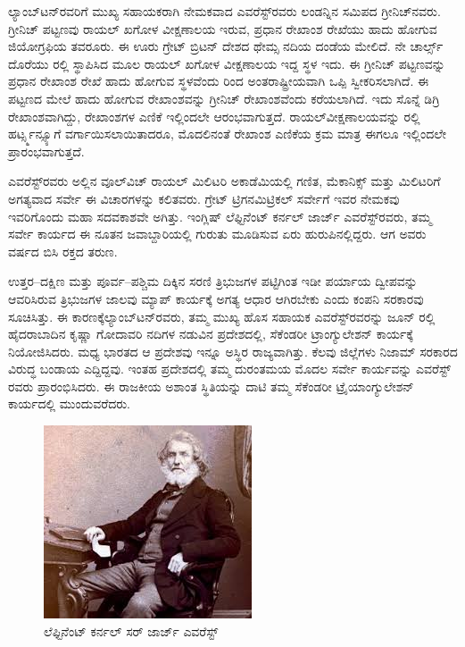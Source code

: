 ಲ್ಯಾಂಬ್​ಟನ್​ರವರಿಗೆ ಮುಖ್ಯ ಸಹಾಯಕರಾಗಿ ನೇಮಕವಾದ ಎವರೆಸ್ಟ್​ರವರು ಲಂಡನ್ನಿನ ಸಮಿಪದ ಗ್ರೀನಿಚ್​ನವರು. ಗ್ರೀನಿಚ್​ ಪಟ್ಟಣವು ರಾಯಲ್​ ಖಗೋಳ ವೀಕ್ಷಣಾಲಯ ಇರುವ, ಪ್ರಧಾನ ರೇಖಾಂಶ ರೇಖೆಯು ಹಾದು ಹೋಗುವ ಜಿಯೋಗ್ರಫಿಯ ತವರೂರು. ಈ ಊರು ಗ್ರೇಟ್​ ಬ್ರಿಟನ್​ ದೇಶದ ಥೇಮ್ಸ ನದಿಯ ದಂಡೆಯ ಮೇಲಿದೆ. ನೇ ಚಾರ್ಲ್ಸ್ ದೊರೆಯು ರಲ್ಲಿ ಸ್ಥಾಪಿಸಿದ ಮೂಲ ರಾಯಲ್​ ಖಗೋಳ ವೀಕ್ಷಣಾಲಯ ಇದ್ದ ಸ್ಥಳ ಇದು. ಈ ಗ್ರೀನಿಚ್​ ಪಟ್ಟಣವನ್ನು ಪ್ರಧಾನ ರೇಖಾಂಶ ರೇಖೆ ಹಾದು ಹೋಗುವ ಸ್ಥಳವೆಂದು  ರಿಂದ ಅಂತರಾಷ್ಟ್ರೀಯವಾಗಿ ಒಪ್ಪಿ ಸ್ವೀಕರಿಸಲಾಗಿದೆ. ಈ ಪಟ್ಟಣದ ಮೇಲೆ ಹಾದು ಹೋಗುವ ರೇಖಾಂಶವನ್ನು ಗ್ರೀನಿಚ್​ ರೇಖಾಂಶವೆಂದು ಕರೆಯಲಾಗಿದೆ. ಇದು ಸೊನ್ನೆ ಡಿಗ್ರಿ ರೇಖಾಂಶವಾಗಿದ್ದು, ರೇಖಾಂಶಗಳ ಎಣಿಕೆ ಇಲ್ಲಿಂದಲೇ ಆರಂಭವಾಗುತ್ತದೆ. ರಾಯಲ್​\break ವೀಕ್ಷಣಾಲಯವನ್ನು ರಲ್ಲಿ ಹರ್ಟ್ಸ್ಮನ್ಸ್ಯೂಗೆ ವರ್ಗಾಯಿಸಲಾಯಿತಾದರೂ, ಮೊದಲಿನಂತೆ ರೇಖಾಂಶ ಎಣಿಕೆಯ ಕ್ರಮ ಮಾತ್ರ ಈಗಲೂ ಇಲ್ಲಿಂದಲೇ ಪ್ರಾರಂಭವಾಗುತ್ತದೆ.

ಎವರೆಸ್ಟ್​ರವರು ಅಲ್ಲಿನ ವೂಲ್​ವಿಚ್​ ರಾಯಲ್​ ಮಿಲಿಟರಿ ಅಕಾಡೆಮಿಯಲ್ಲಿ ಗಣಿತ, ಮೆಕಾನಿಕ್ಸ್​ ಮತ್ತು ಮಿಲಿಟರಿಗೆ ಅಗತ್ಯವಾದ ಸರ್ವೇ ಈ ವಿಚಾರಗಳನ್ನು ಕಲಿತವರು. ಗ್ರೇಟ್​ ಟ್ರಿಗನಮಿಟ್ರಿಕಲ್​ ಸರ್ವೇಗೆ ಇವರ ನೇಮಕವು ಇವರಿಗೊಂದು ಮಹಾ ಸದವಕಾಶವೇ ಅಗಿತ್ತು. ಇಂಗ್ಲಿಷ್​ ಲೆಫ್ಟಿನೆಂಟ್​ ಕರ್ನಲ್​ ಜಾರ್ಜ್ ಎವರೆಸ್ಟ್​ರವರು, ತಮ್ಮ ಸರ್ವೇ ಕಾರ್ಯದ ಈ ನೂತನ ಜವಾಬ್ದಾರಿಯಲ್ಲಿ ಗುರುತು ಮೂಡಿಸುವ ಏರು ಹುರುಪಿನಲ್ಲಿದ್ದರು. ಆಗ ಅವರು  ವರ್ಷದ ಬಿಸಿ ರಕ್ತದ ತರುಣ.

ಉತ್ತರ–ದಕ್ಷಿಣ ಮತ್ತು ಪೂರ್ವ–ಪಶ್ಚಿಮ ದಿಕ್ಕಿನ ಸರಣಿ ತ್ರಿಭುಜಗಳ ಪಟ್ಟಿಗಿಂತ ಇಡೀ ಪರ್ಯಾಯ ದ್ವೀಪವನ್ನು ಆವರಿಸಿರುವ ತ್ರಿಭುಜಗಳ ಜಾಲವು ಮ್ಯಾಪ್​ ಕಾರ್ಯಕ್ಕೆ ಅಗತ್ಯ ಆಧಾರ ಆಗಿರಬೇಕು ಎಂದು ಕಂಪನಿ ಸರಕಾರವು ಸೂಚಿಸಿತ್ತು. ಈ ಕಾರಣಕ್ಕೆ\break ಲ್ಯಾಂಬ್​ಟನ್​ರವರು, ತಮ್ಮ ಮುಖ್ಯ ಹೊಸ ಸಹಾಯಕ ಎವರೆಸ್ಟ್​ರವರನ್ನು ಜೂನ್​  ರಲ್ಲಿ ಹೈದರಾಬಾದಿನ ಕೃಷ್ಣಾ ಗೋದಾವರಿ ನದಿಗಳ ನಡುವಿನ ಪ್ರದೇಶದಲ್ಲಿ, ಸೆಕೆಂಡರೀ ಟ್ರಾಂಗ್ಯುಲೇಶನ್​ ಕಾರ್ಯಕ್ಕೆ ನಿಯೋಜಿಸಿದರು. ಮಧ್ಯ ಭಾರತದ ಆ ಪ್ರದೇಶವು ಇನ್ನೂ ಅಸ್ಥಿರ ರಾಜ್ಯವಾಗಿತ್ತು. ಕೆಲವು ಜಿಲ್ಲೆಗಳು ನಿಜಾಮ್ ಸರಕಾರದ ವಿರುದ್ಧ ಬಂಡಾಯ ಎದ್ದಿದ್ದವು. ಇಂತಹ ಪ್ರದೇಶದಲ್ಲಿ ತಮ್ಮ ದುರಂತಮಯ ಮೊದಲ ಸರ್ವೇ ಕಾರ್ಯವನ್ನು ಎವರೆಸ್ಟ್​ರವರು ಪ್ರಾರಂಭಿಸಿದರು. ಈ ರಾಜಕೀಯ ಅಶಾಂತ ಸ್ಥಿತಿಯನ್ನು ದಾಟಿ ತಮ್ಮ ಸೆಕೆಂಡರೀ ಟ್ರೈಯಾಂಗ್ಯುಲೇಶನ್​ ಕಾರ್ಯದಲ್ಲಿ ಮುಂದುವರೆದರು.

\begin{figure}[!htbp]
\includegraphics[scale=0.7]{"images/image012.jpg"}
\caption{ಲೆಫ್ಟಿನೆಂಟ್​ ಕರ್ನಲ್​ ಸರ್​ ಜಾರ್ಜ್ ಎವರೆಸ್ಟ್​}\label{art8-fig1}
\end{figure}

